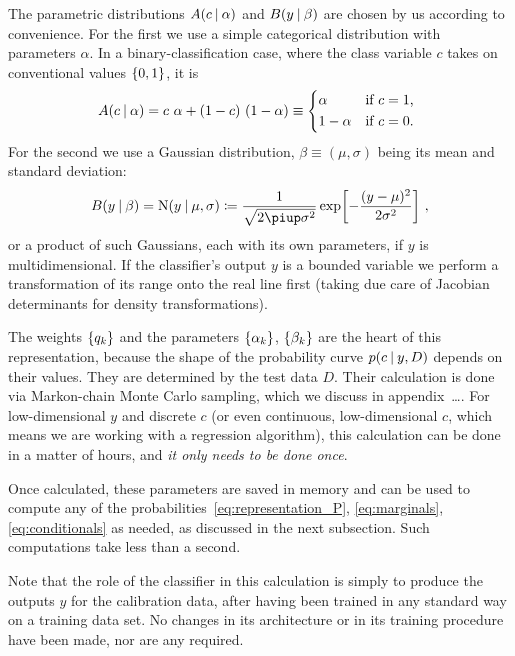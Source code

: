 \documentclass[\ifafour a4paper,12pt,\else a5paper,10pt,\fi%
onecolumn,oneside,article,%
british%
]{memoir}
\theoremstyle{remark}
\theoremstyle{innote}
\newcommand*{\pencil}{{\fontencoding{U}\fontfamily{fontawesometwo}\selectfont\symbol{210}}}
\newcommand{\mynotep}[1]{{\footnotesize\color{notecolour}\pencil\ #1}}
\newcommand*{\pu}{\piup}%
\newcommand*{\defd}{\coloneqq}
\DeclarePairedDelimiter\set{\{}{\}} %
\renewcommand*{\|}[1][]{\nonscript\:#1\vert\nonscript\:\mathopen{}}
\newcommand*{\No}{\mathrm{N}}
\begin{document}
The parametric distributions $A(c \| \alpha)$ and $B(y \| \beta)$ are chosen by us according to convenience. For the first we use a simple categorical distribution with parameters $\alpha$. In a binary-classification case, where the class variable $c$ takes on conventional values $\set{0,1}$, it is
\begin{equation}
  \label{eq:distr_class}
  A(c \| \alpha) = c\ \alpha + (1-c)\ (1-\alpha) \equiv
  \begin{dcases*}
    \alpha& if $c=1$, \\ 1-\alpha & if $c=0$.
  \end{dcases*}
\end{equation}
For the second we use a Gaussian distribution, $\beta \equiv (\mu,\sigma)$ being its mean and standard deviation:
\begin{equation}
  \label{eq:distr_output}
  B(y \| \beta) = \No(y \| \mu, \sigma) \defd \frac{1}{\sqrt{2\pu\sigma^{2}}} \exp\biggl[-\frac{(y-\mu)^{2}}{2\sigma^{2}}\biggr] \ ,
\end{equation}
or a product of such Gaussians, each with its own parameters, if $y$ is multidimensional. If the classifier's output $y$ is a bounded variable we perform a transformation of its range onto the real line first (taking due care of Jacobian determinants for density transformations).

\medskip

The weights $\set{q_{k}}$ and the parameters $\set{\alpha_{k}}$, $\set{\beta_{k}}$ are the heart of this representation, because the shape of the probability curve $p(c \| y, D)$ depends on their values. They are determined by the test data $D$. Their calculation is done via Markon-chain Monte Carlo sampling, which we discuss in appendix\mynotep{\ldots}. For low-dimensional $y$ and discrete $c$ (or even continuous, low-dimensional $c$, which means we are working with a regression algorithm), this calculation can be done in a matter of hours, and \emph{it only needs to be done once}.

Once calculated, these parameters are saved in memory and can be used to compute any of the probabilities~\eqref{eq:representation_P}, \eqref{eq:marginals}, \eqref{eq:conditionals} as needed, as discussed in the next subsection. Such computations take less than a second.

Note that the role of the classifier in this calculation is simply to produce the outputs $y$ for the calibration data, after having been trained in any standard way on a training data set. No changes in its architecture or in its training procedure have been made, nor are any required.
\end{document}
